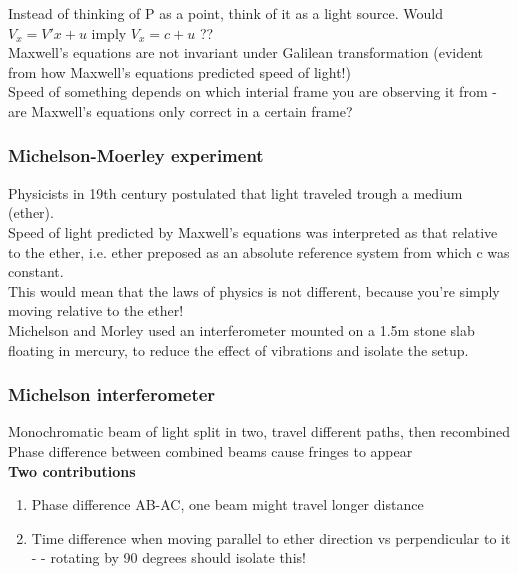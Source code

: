 \documentclass[class=article,crop=false]{standalone}
\begin{document}
Instead of thinking of P as a point, think of it as a light source. Would $V_x = V'x + u$ imply $ V_x = c + u $ ?? \\

Maxwell's equations are not invariant under Galilean transformation (evident from how Maxwell's equations predicted speed of light!) \\
Speed of something depends on which interial frame you are observing it from - are Maxwell's equations only correct in a certain frame? \\

\subsubsection{Michelson-Moerley experiment}
Physicists in 19th century postulated that light traveled trough a medium (ether). \\
Speed of light predicted by Maxwell's equations was interpreted as that relative to the ether, i.e. ether preposed as an absolute reference system from which c was constant. \\
This would mean that the laws of physics is not different, because you're simply moving relative to the ether! \\

Michelson and Morley used an interferometer mounted on a 1.5m stone slab floating in mercury, to reduce the effect of vibrations and isolate the setup. \\

\subsubsection{Michelson interferometer}
Monochromatic beam of light split in two, travel different paths, then recombined \\
Phase difference between combined beams cause fringes to appear \\

\textbf{Two contributions} \\
\begin{enumerate}
	\item Phase difference AB-AC, one beam might travel longer distance \\
	\item Time difference when moving parallel to ether direction vs perpendicular to it - - rotating by 90 degrees should isolate this! \\
\end{enumerate}
\end{document}
